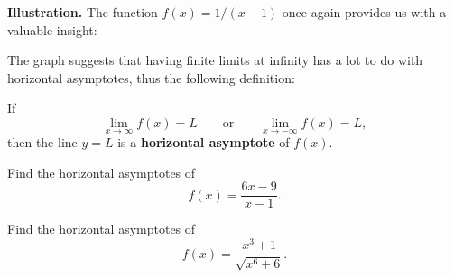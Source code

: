 \documentclass[10pt,t,presentation,ignorenonframetext,aspectratio=169]{beamer}
\begin{document}
\begin{frame}
  \vs

  \textbf{Illustration.} The function $f(x) = 1/(x-1)$ once again
  provides us with a valuable insight:

  \begin{image}[0.7\textwidth]
  \end{image}
\end{frame}

\begin{frame}
  \vs
  The graph suggests that having finite limits at infinity has a lot
  to do with horizontal asymptotes, thus the following definition:

  \begin{defn}
    If
    \[
      \lim_{x\to \infty} f(x) = L
      \qquad\text{or}\qquad
      \lim_{x\to -\infty} f(x) = L,
    \]
    then the line $y=L$ is a \textbf{horizontal asymptote} of $f(x)$.
  \end{defn}
\end{frame}

\begin{frame}
  \vs
  \begin{question}
    Find the horizontal asymptotes of
    \[
      f(x) = \frac{6x-9}{x-1}.
    \]
  \end{question}
\end{frame}

\begin{frame}
  \vs
  \begin{question}
    Find the horizontal asymptotes of
    \[
      f(x) = \frac{x^3+1}{\sqrt{x^6+6}}.
    \]
  \end{question}
\end{frame}
\end{document}
